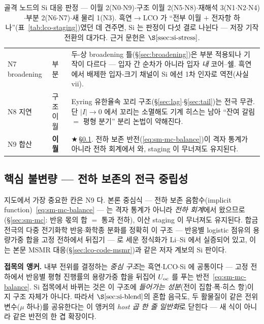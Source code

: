 \begin{table}[h]
\begin{tabular}{p{} p{} p{}}
N7 broadening & 부분 & 두-상 broadening 틀(\S\ref{sec:broadening})은 부분 적용되나 기작이 다르다 --- 입자 간 순차가 아니라 입자 \emph{내} 코어--쉘. 흑연에서 배제한 입자-크기 채널이 Si 에선 1차 인자로 역전(사실 vii). \\
N8 지연 & 구조 이월 & Eyring 유한율속 꼬리 구조(\S\ref{sec:lag}$\cdot$\S\ref{sec:tail})는 전극 무관. 단 $|I|\!\to\!0$ 에서 꼬리는 소멸해도 기계 히스는 남아 ``잔여 갈림 $=$ 평형 분기'' 분리 논법이 약해진다. \\
N9 합산 & \textbf{이월} & $\bigstar$\,\S\ref{ssec:si-carry}. 전하 보존 반전(\eqref{eq:sm-mc-balance})이 격자 통계가 아니라 전하 회계에서 와, staging 이 무너져도 유지된다. \\
\bottomrule
\end{tabular}
\caption{골격 노드의 Si 대응 판정 --- 이월 2(N0$\cdot$N9)$\cdot$구조 이월 2(N5$\cdot$N8)$\cdot$재해석
3(N1$\cdot$N2$\cdot$N4)$\cdot$부분 2(N6$\cdot$N7)$\cdot$새 물리 1(N3). 흑연$\to$LCO 가 ``전부 이월 $+$
전자항 하나''(표~\ref{tab:lco-staging})였던 데 견주면, Si 는 판정이 다섯 결로 나뉜다 --- 저장 기작
전환의 대가다. 근거 문헌은 $\S\ref{ssec:si-stress}$.}
\label{tab:si-survival}
\end{table}

\subsection{핵심 불변량 --- 전하 보존의 전극 중립성}\label{ssec:si-carry}
지도에서 가장 중요한 칸은 N9 다. 본론 중심식 --- 전하 보존 음함수(implicit function)~\eqref{eq:sm-mc-balance} --- 는 격자
통계가 아니라 \emph{전하 회계}에서 왔으므로(\S\ref{sec:sm-mc}: 반응 몫의 합 $=$ 통과 전하), 이산 staging
이 무너져도 유지된다. 합금 전극의 다중 전기화학 반응$\cdot$화학종 분화를 정확히 이 구조 --- 반응별
logistic 점유의 용량가중 합을 고정 전하에서 뒤집기 --- 로 세운 정식화가 Li--Si 에서 실증되어
있고\cite{verbrugge_lisi2016}, 이는 본문 MSMR 대응(\S\ref{sec:lco-code-msmr})과 같은 저자 계보의 Si 판이다.

\begin{keybox}
\textbf{접목의 앵커.} 내부 전위를 결정하는 \emph{중심 구조}는 흑연$\cdot$LCO$\cdot$Si 에 공통이다 ---
고정 전하에서 반응별 평형 진행률의 용량가중 합을 뒤집어 $U_{\mathrm{oc}}$ 를 푸는
반전~\eqref{eq:sm-mc-balance}. Si 접목에서 바뀌는 것은 이 구조에 \emph{들어가는 성분}(전이
집합$\cdot$폭$\cdot$히스 항)이지 구조 자체가 아니다. 따라서 $\S\ref{sec:si-blend}$의 혼합 음극도, 두
활물질이 같은 전위 변수($\mu$ 하나)를 공유한다는 이 앵커의 \emph{host 곱 한 줄 일반화}로 닫힌다 ---
새 식이 아니라 같은 반전의 한 겹 확장이다.
\end{keybox}

